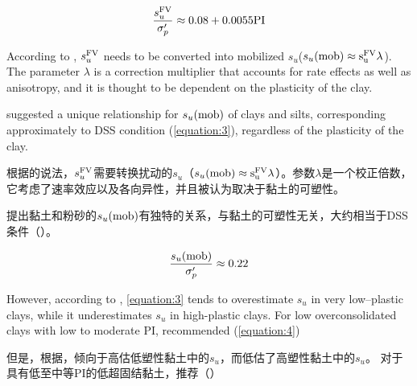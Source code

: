 \begin{align}
    \dfrac{s_u^{\rm{FV}}}{\sigma_p'}\approx{}0.08+0.0055\rm{PI}
    \label{equation:2}
\end{align}

\begin{paracol}{2}

    According to \citet{Bjerrum19721}, $s_u^{\rm{FV}}$ needs to be converted into mobilized $s_u$($s_u(\rm{mob})\approx{}s_u^{\rm{FV}}\lambda$). The parameter $\lambda$ is a correction multiplier that accounts for rate effects as well as anisotropy, and it is thought to be dependent on the plasticity of the clay.
    
    \citet{Mesri1975409,Mesri1989162} suggested a unique relationship for $s_u(\rm{mob})$ of clays and silts, corresponding approximately to DSS condition (\autoref{equation:3}), regardless of the plasticity of the clay.

    \switchcolumn

    根据\citet{Bjerrum19721}的说法，$s_u^{\rm{FV}}$需要转换扰动的$s_u$（$s_u(\rm{mob})\approx{}s_u^{\rm{FV}}\lambda$）。参数$\lambda$是一个校正倍数，它考虑了速率效应以及各向异性，并且被认为取决于黏土的可塑性。
    
    \citet{Mesri1975409,Mesri1989162}提出黏土和粉砂的$s_u(\rm{mob})$有独特的关系，与黏土的可塑性无关，大约相当于DSS条件（）。

\end{paracol}

\begin{align}
    \dfrac{s_u(\rm{mob})}{\sigma_p'}\approx{}0.22
    \label{equation:3}
\end{align}

\begin{paracol}{2}
    
    However, according to \citet{Larsson1980591}, \autoref{equation:3} tends to overestimate $s_u$ in very low–plastic clays, while it underestimates $s_u$ in high-plastic clays. For low overconsolidated clays with low to moderate PI, \citet{Jamiolkowski198557}recommended (\autoref{equation:4})

    \switchcolumn

    但是，根据\citet{Larsson1980591}，倾向于高估低塑性黏土中的$s_u$，而低估了高塑性黏土中的$s_u$。 对于具有低至中等PI的低超固结黏土，\citet{Jamiolkowski198557}推荐（）

\end{paracol}

